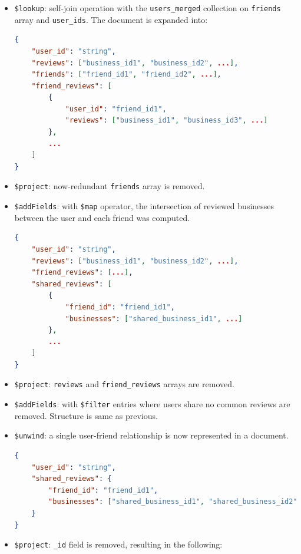 \documentclass{Configuration_Files/PoliMi3i_thesis}
\begin{document}
\begin{itemize}
\begin{itemize}
\item \texttt{\$lookup}: self-join operation with the \texttt{users\_merged} collection on \texttt{friends} array and \texttt{user\_ids}. The document is expanded into:

\begin{lstlisting}[language=json]
{
    "user_id": "string",
    "reviews": ["business_id1", "business_id2", ...],
    "friends": ["friend_id1", "friend_id2", ...],
    "friend_reviews": [
        {
            "user_id": "friend_id1",
            "reviews": ["business_id1", "business_id3", ...]
        },
        ...
    ]
}
\end{lstlisting}

\item \texttt{\$project}: now-redundant \texttt{friends} array is removed.

\item \texttt{\$addFields}: with \texttt{\$map} operator, the intersection of reviewed businesses between the user and each friend was computed.

\begin{lstlisting}[language=json]
{
    "user_id": "string",
    "reviews": ["business_id1", "business_id2", ...],
    "friend_reviews": [...],
    "shared_reviews": [
        {
            "friend_id": "friend_id1",
            "businesses": ["shared_business_id1", ...]
        },
        ...
    ]
}
\end{lstlisting}

\item \texttt{\$project}: \texttt{reviews} and \texttt{friend\_reviews} arrays are removed.

\item \texttt{\$addFields}: with \texttt{\$filter} entries where users share no common reviews are removed. Structure is same as previous.

\item \texttt{\$unwind}: a single user-friend relationship is now represented in a document.

\begin{lstlisting}[language=json]
{
    "user_id": "string",
    "shared_reviews": {
        "friend_id": "friend_id1",
        "businesses": ["shared_business_id1", "shared_business_id2", ...]
    }
}
\end{lstlisting}

\item \texttt{\$project}: \texttt{\_id} field is removed, resulting in the following:


\end{itemize}
\end{itemize}
\end{document}
